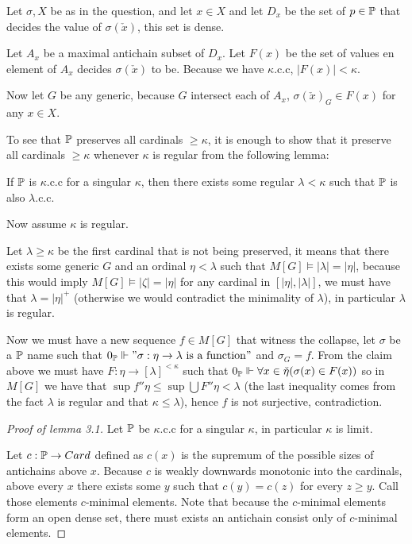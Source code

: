 \begin{cExercise}
	Let $\sigma,X$ be as in the question, and let $x\in X$ and let $D_x$ be the set of $p\in\P$ that decides the value of $\sigma(\check x)$, this set is dense.
	
	Let $A_x$ be a maximal antichain subset of $D_x$. Let $F(x)$ be the set of values en element of $A_x$ decides $\sigma(\check x)$ to be. Because we have $\kappa$.c.c, $|F(x)|<\kappa$.
	
	Now let $G$ be any generic, because $G$ intersect each of $A_x$, $\sigma(\check x)_G\in F(x)$ for any $x\in X$.
	
	To see that $\P$ preserves all cardinals $\ge\kappa$, it is enough to show that it preserve all cardinals $\ge\kappa$ whenever $\kappa$ is regular from the following lemma:
	
	\begin{lemma}
		If $\P$ is $\kappa$.c.c for a singular $\kappa$, then there exists some regular $\lambda<\kappa$ such that $\P$ is also $\lambda$.c.c.
	\end{lemma}
	
	Now assume $\kappa$ is regular.
	
	Let $\lambda\ge\kappa$ be the first cardinal that is not being preserved, it means that there exists some generic $G$ and an ordinal $\eta<\lambda$ such that $M[G]\models |\lambda|=|\eta|$,  because  this would imply $M[G]\models |\zeta|=|\eta|$ for any cardinal in $[|\eta|,|\lambda|]$, we must have that $\lambda=|\eta|^+$ (otherwise we would contradict the minimality of $\lambda$), in particular $\lambda$ is regular.
	
	Now we must have a new sequence $f\in M[G]$ that witness the collapse, let $\sigma$ be a $\P$ name such that $0_\P\force "\sigma:\eta\to\lambda\text{ is a function}"$ and $\sigma_G=f$. From the claim above we must have $F:\eta\to [\lambda]^{<\kappa}$ such that $0_\P\force\forall x\in\check\eta (\sigma(x)\in F(x))$ so in $M[G]$ we have that $\sup f''\eta \le \sup \bigcup F''\eta<\lambda$ (the last inequality comes from the fact $\lambda$ is regular and that $\kappa\le\lambda$), hence $f$ is not surjective, contradiction.
	
	\begin{proof}[Proof of lemma 3.1]
		Let $\P$ be $\kappa$.c.c for a singular $\kappa$, in particular $\kappa$ is limit.
		
		Let $c:\P\to Card$ defined as $c(x)$ is the supremum of the possible sizes of antichains above $x$. Because $c$ is weakly downwards monotonic into the cardinals, above every $x$ there exists some $y$ such that $c(y)=c(z)$ for every $z\ge y$. Call those elements $c$-minimal elements. Note that because the $c$-minimal elements form an open dense set, there must exists an antichain consist only of $c$-minimal elements.
		

\end{proof}
\end{cExercise}
